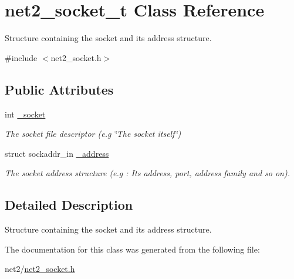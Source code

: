 \hypertarget{structnet2__socket__t}{\section{net2\-\_\-socket\-\_\-t Class Reference}
\label{structnet2__socket__t}
}


Structure containing the socket and its address structure.  




{\ttfamily \#include $<$net2\-\_\-socket.\-h$>$}

\subsection*{Public Attributes}
\begin{DoxyCompactItemize}
\item 
\hypertarget{structnet2__socket__t_a605421383ca1720f2f46dbc19b4fd101}{int \hyperlink{structnet2__socket__t_a605421383ca1720f2f46dbc19b4fd101}{\-\_\-socket}}\label{structnet2__socket__t_a605421383ca1720f2f46dbc19b4fd101}

\begin{DoxyCompactList}\small\item\em The socket file descriptor (e.\-g \char`\"{}\-The socket itself\char`\"{}) \end{DoxyCompactList}\item 
\hypertarget{structnet2__socket__t_a6527b2540e35955db1187ddee8b75877}{struct sockaddr\-\_\-in \hyperlink{structnet2__socket__t_a6527b2540e35955db1187ddee8b75877}{\-\_\-address}}\label{structnet2__socket__t_a6527b2540e35955db1187ddee8b75877}

\begin{DoxyCompactList}\small\item\em The socket address structure (e.\-g \-: Its address, port, address family and so on). \end{DoxyCompactList}\end{DoxyCompactItemize}


\subsection{Detailed Description}
Structure containing the socket and its address structure. 

The documentation for this class was generated from the following file\-:\begin{DoxyCompactItemize}
\item 
net2/\hyperlink{net2__socket_8h}{net2\-\_\-socket.\-h}\end{DoxyCompactItemize}
